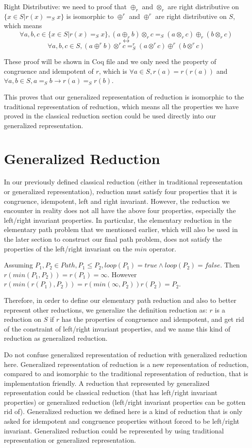 \documentclass[a4paper,12pt,twoside,openright]{report}
\begin{document}
Right Distributive: we need to proof that $\oplus_r$ and $\otimes_r$ are right distributive on $\{x \in S | r(x) =_S x\}$ is isomorphic to $\oplus^r$ and $\oplus^r$ are right distributive on $S$, which means 
\[\forall a,b,c \in \{x \in S | r(x) =_S x \}, (a \oplus_r b) \otimes_r c =_S (a \otimes_r c) \oplus_r (b \otimes_r c) \]
\[\longleftrightarrow \]
\[\forall a,b,c \in S, (a \oplus^r b) \otimes^r c =^r_S (a \otimes^r c) \oplus^r (b \otimes^r c)
\]

These proof will be shown in Coq file and we only need the property of congruence and idempotent of $r$, which is $\forall a \in S, r(a) = r(r(a))$ and $\forall a,b \in S, a =_S b \rightarrow r(a) =_S r(b)$.

This proves that our generalized representation of reduction is isomorphic to the traditional representation of reduction, which means all the properties we have proved in the classical reduction section could be used directly into our generalized representation.

\section{Generalized Reduction}
In our previously defined classical reduction (either in traditional representation or generalized representation), reduction must satisfy four properties that it is congruence, idempotent, left and right invariant. However, the reduction we encounter in reality does not all have the above four properties, especially the left/right invariant properties. In particular, the elementary reduction in the elementary path problem that we mentioned earlier, which will also be used in the later section to construct our final path problem, does not satisfy the properties of the left/right invariant on the $min$ operator. 

Assuming $P_1,P_2 \in Path, P_1 \leq P_2, loop(P_1) = true \wedge loop(P_2) = false$. 
Then $r(min(P_1,P_2)) = r(P_1) = \infty$.
However $r(min(r(P_1),P_2)) = r(min(\infty,P_2)) r(P_2) = P_2$. 

Therefore, in order to define our elementary path reduction and also to better represent other reductions, we generalize the definition reduction as: $r$ is a reduction on $S$ if $r$ has the properties of congruence and idempotent, and get rid of the constraint of left/right invariant properties, and we name this kind of reduction as generalized reduction.

Do not confuse generalized representation of reduction with generalized reduction here. 
Generalized representation of reduction is a new representation of reduction, compared to and isomorphic to the traditional representation of reduction, that is implementation friendly. A reduction that represented by generalized representation could be classical reduction (that has left/right invariant properties) or generalized reduction (left/right invariant properties can be gotten rid of).
Generalized reduction we defined here is a kind of reduction that is only asked for idempotent and congruence properties without forced to be left/right invariant. Generalized reduction could be represented by using traditional representation or generalized representation.
\end{document}
